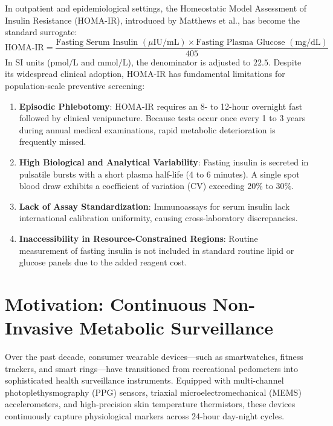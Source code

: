 \documentclass[12pt,a4paper,oneside]{report}
\begin{document}
In outpatient and epidemiological settings, the Homeostatic Model Assessment of Insulin Resistance (HOMA-IR), introduced by Matthews et al., has become the standard surrogate:
\begin{equation}
\text{HOMA-IR} = \frac{\text{Fasting Serum Insulin } (\mu\text{IU/mL}) \times \text{Fasting Plasma Glucose } (\text{mg/dL})}{405}
\label{eq:homair}
\end{equation}
In SI units ($\text{pmol/L}$ and $\text{mmol/L}$), the denominator is adjusted to $22.5$. Despite its widespread clinical adoption, HOMA-IR has fundamental limitations for population-scale preventive screening:
\begin{enumerate}
    \item \textbf{Episodic Phlebotomy}: HOMA-IR requires an 8- to 12-hour overnight fast followed by clinical venipuncture. Because tests occur once every 1 to 3 years during annual medical examinations, rapid metabolic deterioration is frequently missed.
    \item \textbf{High Biological and Analytical Variability}: Fasting insulin is secreted in pulsatile bursts with a short plasma half-life (4 to 6 minutes). A single spot blood draw exhibits a coefficient of variation (CV) exceeding 20\% to 30\%.
    \item \textbf{Lack of Assay Standardization}: Immunoassays for serum insulin lack international calibration uniformity, causing cross-laboratory discrepancies.
    \item \textbf{Inaccessibility in Resource-Constrained Regions}: Routine measurement of fasting insulin is not included in standard routine lipid or glucose panels due to the added reagent cost.
\end{enumerate}

\section{Motivation: Continuous Non-Invasive Metabolic Surveillance}
Over the past decade, consumer wearable devices---such as smartwatches, fitness trackers, and smart rings---have transitioned from recreational pedometers into sophisticated health surveillance instruments. Equipped with multi-channel photoplethysmography (PPG) sensors, triaxial microelectromechanical (MEMS) accelerometers, and high-precision skin temperature thermistors, these devices continuously capture physiological markers across 24-hour day-night cycles.
\end{document}

